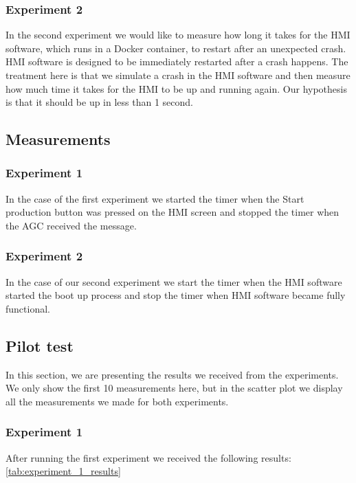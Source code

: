 \subsubsection{Experiment 2}
\label{sec:experiment_2}
In the second experiment we would like to measure how long it takes for the HMI software, which runs in a Docker container, to restart after an unexpected crash. HMI software is designed to be immediately restarted after a crash happens. The treatment here is that we simulate a crash in the HMI software and then measure how much time it takes for the HMI to be up and running again. Our hypothesis is that it should be up in less than 1 second.

\subsection{Measurements}
\label{sec:measurements}
\subsubsection{Experiment 1}
In the case of the first experiment we started the timer when the Start production button was pressed on the HMI screen and stopped the timer when the AGC received the message.

\subsubsection{Experiment 2}
In the case of our second experiment we start the timer when the HMI software started the boot up process and stop the timer when HMI software became fully functional.

\subsection{Pilot test}
\label{sec:pilot_test}
In this section, we are presenting the results we received from the experiments. We only show the first 10 measurements here, but in the scatter plot we display all the measurements we made for both experiments.

\subsubsection{Experiment 1}
After running the first experiment we received the following results: \ref{tab:experiment_1_results}

